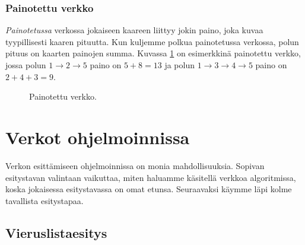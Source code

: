 \subsubsection{Painotettu verkko}

\emph{Painotetussa} verkossa
jokaiseen kaareen liittyy jokin paino,
joka kuvaa tyypillisesti kaaren pituutta.
Kun kuljemme polkua painotetussa verkossa,
polun pituus on kaarten painojen summa.
Kuvassa \ref{fig:verpae} on esimerkkinä painotettu verkko,
jossa polun $1 \rightarrow 2 \rightarrow 5$
paino on $5+8=13$ ja polun
$1 \rightarrow 3 \rightarrow 4 \rightarrow 5$
paino on $2+4+3=9$.

\begin{figure}
\center
\begin{center}
\end{center}
\caption{Painotettu verkko.}
\label{fig:verpae}
\end{figure}


\section{Verkot ohjelmoinnissa}

Verkon esittämiseen ohjelmoinnissa on monia mahdollisuuksia.
Sopivan esitystavan valintaan vaikuttaa,
miten haluamme käsitellä verkkoa algoritmissa,
koska jokaisessa esitystavassa on omat etunsa.
Seuraavaksi käymme läpi kolme tavallista esitystapaa.

\subsection{Vieruslistaesitys}

